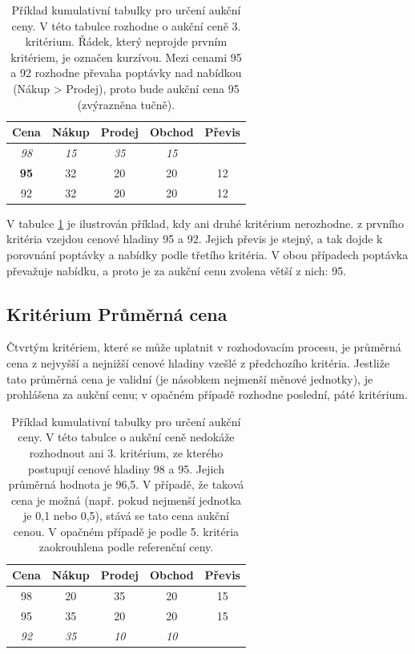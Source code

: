 \documentclass[thesis=M,czech]{FITthesis}[2012/06/26]
\begin{document}
\begin{table}\centering
	\begin{tabular}{|c|c|c|c|c|}\hline
		Cena		& Nákup	& Prodej	& Obchod	& Převis		\tabularnewline \hline \hline
		\textit{98} 	& \textit{15}	& \textit{35}	& \textit{15}	& 	 		\tabularnewline \hline
		\textbf{95}	& 32 		& 20 		& 20 		& 12	 		\tabularnewline \hline
		92		& 32 		& 20 		& 20 		& 12		 	\tabularnewline \hline
	\end{tabular}
	\caption[Příklad tabulky pro určení aukční ceny]{Příklad kumulativní tabulky pro určení aukční ceny. V této tabulce rozhodne
		o aukční ceně 3. kritérium. Řádek, který neprojde prvním kritériem, je označen kurzívou. Mezi cenami 95 a 92 rozhodne
		převaha poptávky nad nabídkou (Nákup > Prodej), proto bude aukční cena 95 (zvýrazněna tučně).}
	\label{tab:pricecalcex3}
\end{table}

V tabulce \ref{tab:pricecalcex3} je ilustrován příklad, kdy ani druhé kritérium nerozhodne. z prvního kritéria vzejdou cenové hladiny 
95 a 92. Jejich převis je stejný, a tak dojde k porovnání poptávky a nabídky podle třetího kritéria. V obou případech poptávka převažuje
nabídku, a proto je za aukční cenu zvolena větší z nich: 95.


\subsection{Kritérium Průměrná cena}

Čtvrtým kritériem, které se může uplatnit v rozhodovacím procesu, je průměrná cena z nejvyšší a nejnižší cenové hladiny vzešlé 
z předchozího kritéria. Jestliže tato průměrná cena je validní (je násobkem nejmenší měnové jednotky), je prohlášena za aukční 
cenu; v opačném případě rozhodne poslední, páté kritérium.

\begin{table}\centering
	\begin{tabular}{|c|c|c|c|c|}\hline
		Cena		& Nákup	& Prodej	& Obchod	& Převis		\tabularnewline \hline \hline
		98	 	& 20 		& 35 		& 20 		& 15	 		\tabularnewline \hline
		95		& 35 		& 20 		& 20 		& 15		 	\tabularnewline \hline
		\textit{92} 	& \textit{35}	& \textit{10}	& \textit{10}	&			\tabularnewline \hline
	\end{tabular}
	\caption[Příklad tabulky pro určení aukční ceny]{Příklad kumulativní tabulky pro určení aukční ceny. V této tabulce o aukční ceně 
		nedokáže rozhodnout ani 3. kritérium, ze kterého postupují cenové hladiny 98 a 95. Jejich průměrná hodnota je 96,5.
		V případě, že taková cena je možná (např. pokud nejmenší jednotka je 0,1 nebo 0,5), stává se tato cena aukční cenou.
		V opačném případě je podle 5. kritéria zaokrouhlena podle referenční ceny.}
	\label{tab:pricecalcex45}
\end{table}
\end{document}
